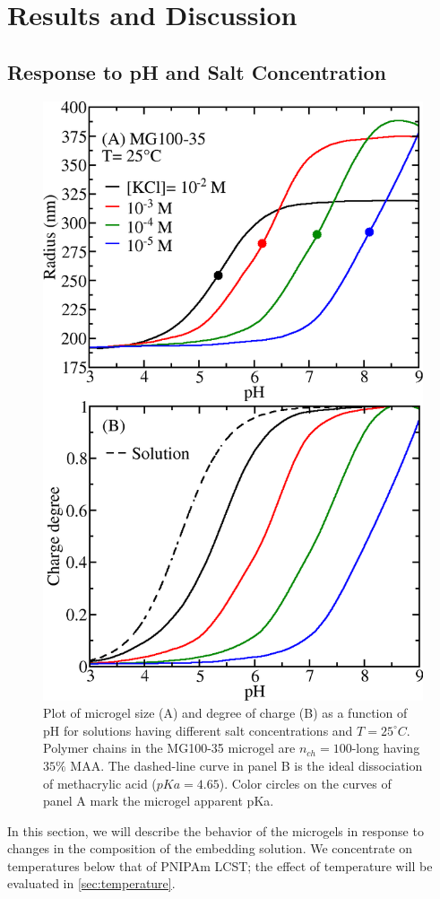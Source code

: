 \section{Results and Discussion}



\subsection{Response to pH and Salt Concentration}\label{sec:pH_salt}


\begin{figure}[!ht]
\centering
\includegraphics[width=0.5\linewidth]{Figures/graph-gel/R-pH.png}
\caption{Plot of microgel size (A) and degree of charge (B) as a function of pH for solutions having different salt concentrations and $T=25 ^\circ C$.
Polymer chains in the MG100-35 microgel are $n_{ch}=100$-long having $35\% $ MAA.
The dashed-line curve in panel B is the ideal dissociation of methacrylic acid ($pKa=4.65$).
Color circles on the curves of panel A mark the microgel apparent pKa.}
\label{fig:R-pH}
\end{figure}


In this section, we will describe the behavior of the microgels in response to changes in the composition of the embedding solution.
We concentrate on temperatures below that of PNIPAm LCST;
the effect of temperature will be evaluated in \ref{sec:temperature}.

